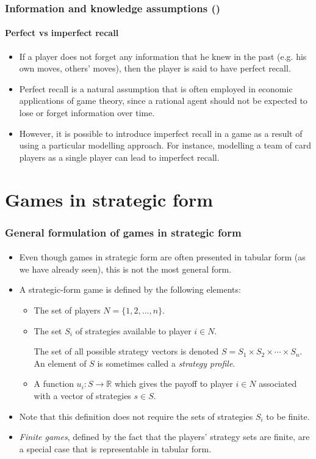 \documentclass[10pt]{beamer}
\theoremstyle{definition}
\begin{document}
\begin{frame}[fragile]
\frametitle{Information and knowledge assumptions ()}
\framesubtitle{Perfect vs imperfect recall}
\begin{itemize}\itemsep1em
\item If a player does not forget any information that he knew in the past (e.g. his own moves, others' moves), then the player is said to have perfect recall.
\item Perfect recall is a natural assumption that is often employed in economic applications of game theory, since a rational agent should not be expected to lose or forget information over time.
\item However, it is possible to introduce imperfect recall in a game as a result of using a particular modelling approach. For instance, modelling a team of card players as a single player can lead to imperfect recall.
\end{itemize}
\end{frame}

\section{Games in strategic form}

\begin{frame}[fragile]
\frametitle{General formulation of games in strategic form}
\framesubtitle{}
\begin{itemize}\itemsep1em
\item Even though games in strategic form are often presented in tabular form (as we have already seen), this is not the most general form.
\item A strategic-form game is defined by the following elements:
	\begin{itemize}\itemsep1em
	\item The set of players $ N = \{1,2,\ldots,n\} $.
	\item The set $ S_i $ of strategies available to player $ i\in N $.
	
	The set of all possible strategy vectors is denoted $ S = S_1 \times S_2 \times \cdots \times S_n $. An element of $ S $ is sometimes called a \emph{strategy profile}.
	\item A function $ u_i : S \rightarrow \mathbb{R} $ which gives the payoff to player $ i \in N$ associated with a vector of strategies $ s \in S $.
	\end{itemize}
\item Note that this definition does not require the sets of strategies $ S_i $ to be finite. 
\item \emph{Finite games}, defined by the fact that the players' strategy sets are finite, are a special case that is representable in tabular form.
\end{itemize}
\end{frame}
\end{document}
